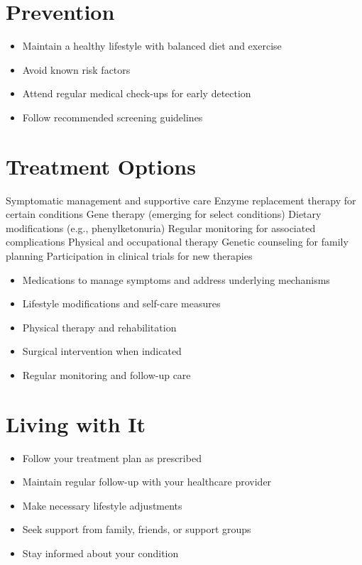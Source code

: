 \section{Prevention}
\begin{itemize}[noitemsep]
  \item Maintain a healthy lifestyle with balanced diet and exercise
  \item Avoid known risk factors
  \item Attend regular medical check-ups for early detection
  \item Follow recommended screening guidelines
\end{itemize}
\section{Treatment Options}
Symptomatic management and supportive care Enzyme replacement therapy for certain conditions Gene therapy (emerging for select conditions) Dietary modifications (e.g., phenylketonuria) Regular monitoring for associated complications Physical and occupational therapy Genetic counseling for family planning Participation in clinical trials for new therapies

\begin{itemize}[noitemsep]
  \item Medications to manage symptoms and address underlying mechanisms
  \item Lifestyle modifications and self-care measures
  \item Physical therapy and rehabilitation
  \item Surgical intervention when indicated
  \item Regular monitoring and follow-up care
\end{itemize}
\section{Living with It}
\begin{itemize}[noitemsep]
  \item Follow your treatment plan as prescribed
  \item Maintain regular follow-up with your healthcare provider
  \item Make necessary lifestyle adjustments
  \item Seek support from family, friends, or support groups
  \item Stay informed about your condition
\end{itemize}
